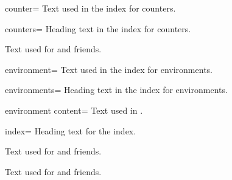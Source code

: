 \begin{langTcbKey}[][doc new={2015-01-08}]{counter}{=}{}
  Text used in the index for counters.
\end{langTcbKey}

\begin{langTcbKey}[][doc new={2015-01-08}]{counters}{=}{}
  Heading text in the index for counters.
\end{langTcbKey}

\begin{langTcbKeys}[
    doc name              = default,
    doc parameter eq meta = text,
    doc description init  = default,
    doc new               = 2026-05-26
  ]{}
  Text used for  and friends.
\end{langTcbKeys}

\begin{langTcbKey}{environment}{=}{}
  Text used in the index for environments.
\end{langTcbKey}

\begin{langTcbKey}{environments}{=}{}
  Heading text in the index for environments.
\end{langTcbKey}

\begin{langTcbKey}{environment content}{=}{}
  Text used in .
\end{langTcbKey}

\begin{langTcbKey}{index}{=}{}
  Heading text for the index.
\end{langTcbKey}

\begin{langTcbKeys}[
    doc name              = initially,
    doc parameter eq meta = text,
    doc description init  = initially,
    doc new               = 2026-05-26
  ]{}
  Text used for  and friends.
\end{langTcbKeys}

\begin{langTcbKeys}[
    doc name              = initiallyempty,
    doc parameter eq meta = text,
    doc description init  = initially empty,
    doc new               = 2026-05-26
  ]{}
  Text used for  and friends.
\end{langTcbKeys}

